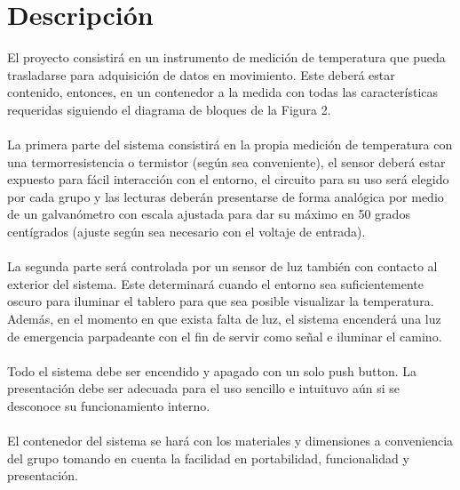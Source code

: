 \documentclass[letterpaper, 12 pt, conference]{ieeeconf}  %
\begin{document}
\section{Descripción}
El proyecto consistirá en un instrumento de medición de temperatura que pueda trasladarse para adquisición de datos en movimiento. Este deberá estar contenido, entonces, en un contenedor a la medida con todas las características requeridas siguiendo el diagrama de bloques de la Figura 2.\\
\\
La primera parte del sistema consistirá en la propia medición de temperatura con una termorresistencia o termistor (según sea conveniente), el sensor deberá estar expuesto para fácil interacción con el entorno, el circuito para su uso será elegido por cada grupo y las lecturas deberán presentarse de forma analógica por medio de un galvanómetro con escala ajustada para dar su máximo en 50 grados centígrados (ajuste según sea necesario con el voltaje de entrada).\\
\\
La segunda parte será controlada por un sensor de luz también con contacto al exterior del sistema. Este determinará cuando el entorno sea suficientemente oscuro para iluminar el tablero para que sea posible visualizar la temperatura. Además, en el momento en que exista falta de luz, el sistema encenderá una luz de emergencia parpadeante con el fin de servir como señal e iluminar el camino.\\
\\
Todo el sistema debe ser encendido y apagado con un solo push button. La presentación debe ser adecuada para el uso sencillo e intuituvo aún si se desconoce su funcionamiento interno.\\
\\
El contenedor del sistema se hará con los materiales y dimensiones a conveniencia del grupo tomando en cuenta la facilidad en portabilidad, funcionalidad y presentación.
\end{document}
